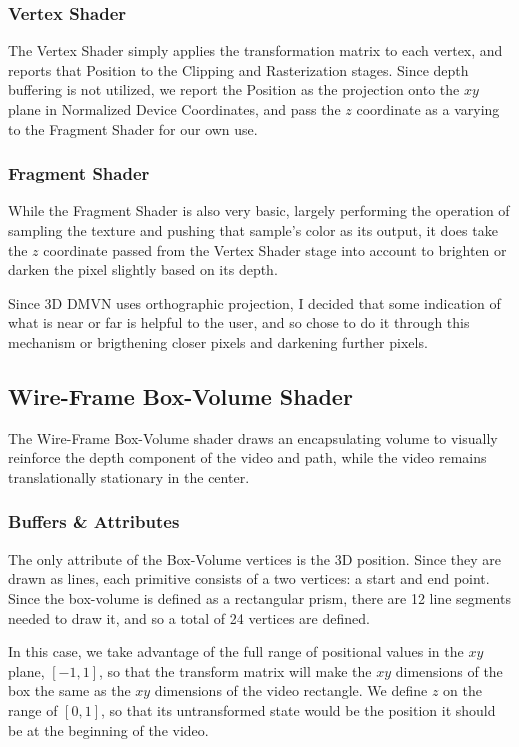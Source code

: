 \subsubsection{Vertex Shader}
The Vertex Shader simply applies the transformation matrix to each vertex, and reports that Position to the Clipping and Rasterization stages. Since depth buffering is not utilized, we report the Position as the projection onto the $xy$ plane in Normalized Device Coordinates, and pass the $z$ coordinate as a varying to the Fragment Shader for our own use.

\subsubsection{Fragment Shader}
While the Fragment Shader is also very basic, largely performing the operation of sampling the texture and pushing that sample's color as its output, it does take the $z$ coordinate passed from the Vertex Shader stage into account to brighten or darken the pixel slightly based on its depth.
\par Since 3D DMVN uses orthographic projection, I decided that some indication of what is near or far is helpful to the user, and so chose to do it through this mechanism or brigthening closer pixels and darkening further pixels.

\subsection{Wire-Frame Box-Volume Shader}
The Wire-Frame Box-Volume shader draws an encapsulating volume to visually reinforce the depth component of the video and path, while the video remains translationally stationary in the center.

\subsubsection{Buffers \& Attributes}
The only attribute of the Box-Volume vertices is the 3D position. Since they are drawn as lines, each primitive consists of a two vertices: a start and end point. Since the box-volume is defined as a rectangular prism, there are 12 line segments needed to draw it, and so a total of 24 vertices are defined.
\par In this case, we take advantage of the full range of positional values in the $xy$ plane, $[-1,1]$, so that the transform matrix will make the $xy$ dimensions of the box the same as the $xy$ dimensions of the video rectangle. We define $z$ on the range of $[0,1]$, so that its untransformed state would be the position it should be at the beginning of the video.

